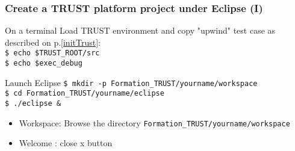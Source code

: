 \documentclass[10pt, hyperref={unicode=true,pdfusetitle, bookmarks=true,bookmarksnumbered=false,bookmarksopen=false, breaklinks=false,pdfborder={0 0 1},backref=true,colorlinks=true,linkcolor=darkblue,pageanchor, urlcolor=darkblue}]{beamer}
\begin{document}
\begin{frame}
\begin{columns}[c] 
\tableofcontents[sections={1-4},currentsection, currentsubsection]
\tableofcontents[sections={5-10},currentsection, currentsubsection]
\end{columns}
\end{frame}
\begin{frame}
\frametitle{Create a TRUST platform project under Eclipse (I)}

\begin{block}{On a terminal}
Load TRUST environment and copy "upwind" test case as described on p.\ref{initTrust}: \\
\texttt{\$ echo \$TRUST\_ROOT/src} \\
\texttt{\$ echo \$exec\_debug} \\
\end{block}

\begin{exampleblock}{Launch Eclipse}
\texttt{\$ mkdir -p Formation\_TRUST/yourname/workspace}\\
\texttt{\$ cd Formation\_TRUST/yourname/eclipse}\\
\texttt{\$ ./eclipse \&}
%
\begin{itemize}
\item Workspace: Browse the directory \texttt{Formation\_TRUST/yourname/workspace} 
\item Welcome : close x button
\end{itemize}
%
\end{exampleblock}

\end{frame}
\end{document}
